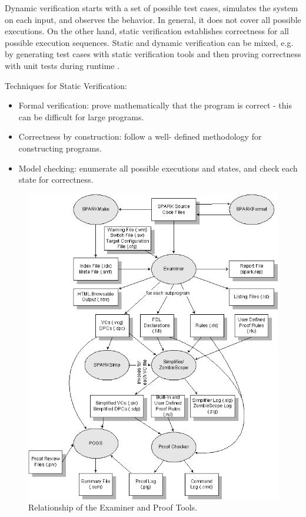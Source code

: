 Dynamic verification starts with a set of possible test cases, simulates the system on each input, and observes the behavior. In general, it does not cover all possible executions. On the other hand, static verification establishes correctness for all possible execution sequences. Static and dynamic verification can be mixed, e.g. by generating test cases with static verification tools and then proving correctness with unit tests during runtime \cite{KUnit:Paper}.

Techniques for Static Verification:
\begin{itemize}
	\item Formal verification: prove mathematically that the program is correct - this can be difficult for large programs.
	\item Correctness by construction: follow a well- defined methodology for constructing programs.
	\item Model checking: enumerate all possible executions and states, and check each state for correctness.
\end{itemize}

\begin{figure}[ht]%
    \begin{center}
    	\includegraphics[height=0.6\textheight]{figures/spark-tools.png}    	
    \end{center}
    \caption{Relationship of the Examiner and Proof Tools\protect\footnotemark.}
    \label{figure:spark-tools}
\end{figure}


